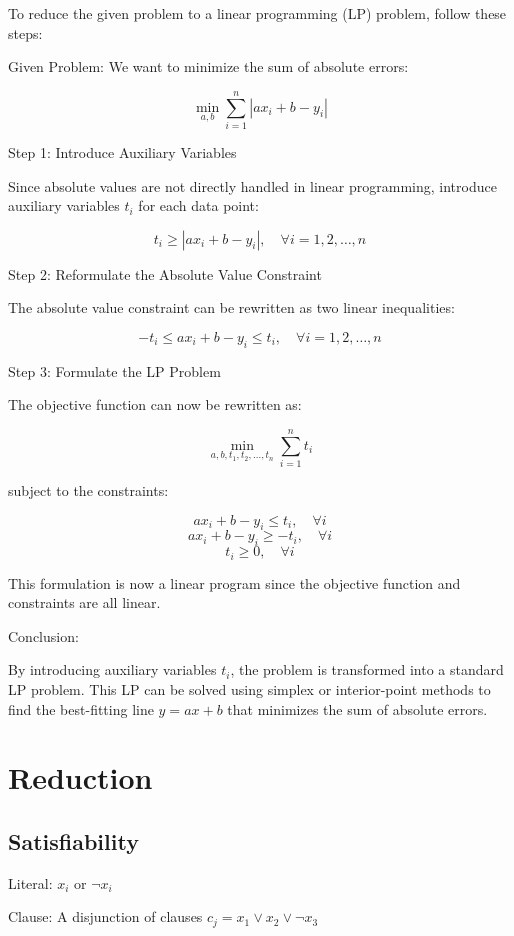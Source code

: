 \documentclass[12pt,a4paper]{article}
\begin{document}
To reduce the given problem to a linear programming (LP) problem, follow these steps:

Given Problem:
We want to minimize the sum of absolute errors:

\[
\min_{a, b} \sum_{i=1}^{n} |a x_i + b - y_i|
\]

Step 1: Introduce Auxiliary Variables

Since absolute values are not directly handled in linear programming, introduce auxiliary variables \( t_i \) for each data point:

\[
t_i \geq |a x_i + b - y_i|, \quad \forall i = 1, 2, \dots, n
\]

Step 2: Reformulate the Absolute Value Constraint

The absolute value constraint can be rewritten as two linear inequalities:

\[
- t_i \leq a x_i + b - y_i \leq t_i, \quad \forall i = 1, 2, \dots, n
\]

Step 3: Formulate the LP Problem

The objective function can now be rewritten as:

\[
\min_{a, b, t_1, t_2, \dots, t_n} \sum_{i=1}^{n} t_i
\]

subject to the constraints:

\[
a x_i + b - y_i \leq t_i, \quad \forall i
\]
\[
a x_i + b - y_i \geq -t_i, \quad \forall i
\]
\[
t_i \geq 0, \quad \forall i
\]

This formulation is now a linear program since the objective function and constraints are all linear.

Conclusion:

By introducing auxiliary variables \( t_i \), the problem is transformed into a standard LP problem. This LP can be solved using simplex or interior-point methods to find the best-fitting line \( y = ax + b \) that minimizes the sum of absolute errors.

\section*{Reduction}



\subsection*{Satisfiability}

Literal: $x_i$ or $\neg x_i$

Clause: A disjunction of clauses $c_j = x_1 \lor x_2 \lor \neg x_3$
\end{document}
